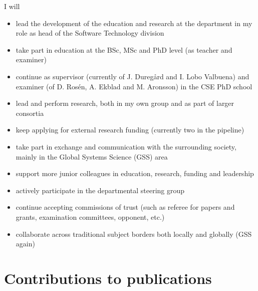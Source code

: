 I will
\begin{itemize}
\item lead the development of the education and research at the
  department in my role as head of the Software Technology division

\item take part in education at the BSc, MSc and PhD level (as
  teacher and examiner)

\item continue as supervisor (currently of J. Duregård and I. Lobo
  Valbuena) and examiner (of D. Rosén, A. Ekblad and M. Aronsson) in
  the CSE PhD school

\item lead and perform research, both in my own group and as part of
  larger consortia

\item keep applying for external research funding (currently two
  in the pipeline)

\item take part in exchange and communication with the surrounding
  society, mainly in the Global Systems Science (GSS) area

\item support more junior colleagues in education, research, funding
  and leadership

\item actively participate in the departmental steering group

\item continue accepting commissions of trust (such as referee for
  papers and grants, examination committees, opponent, etc.)

\item collaborate across traditional subject borders both locally and
  globally (GSS again)
\end{itemize}




\renewcommand{\bibfont}{\small}
%

%




\appendix
\newpage
\section{Contributions to publications}


